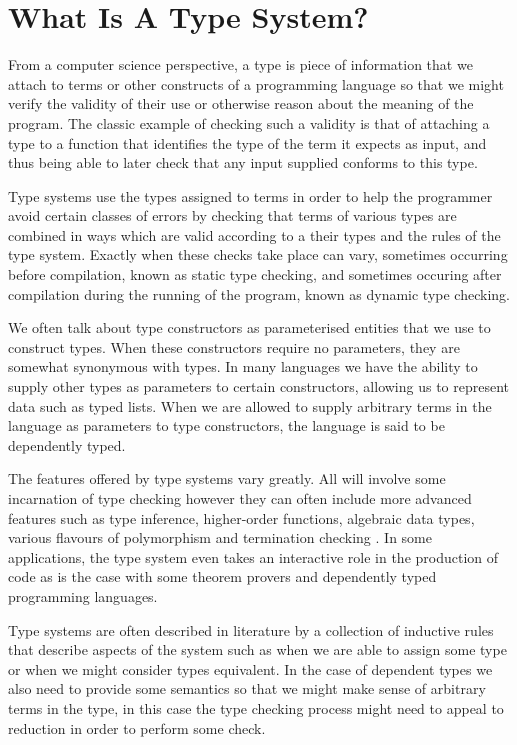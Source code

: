 \chapter{What Is A Type System?}

From a computer science perspective, a type is piece of information
that we attach to terms or other constructs of a programming language
so that we might verify the validity of their use or otherwise reason
about the meaning of the program. The classic example of checking such
a validity is that of attaching a type to a function that identifies
the type of the term it expects as input, and thus being able to later
check that any input supplied conforms to this type.

Type systems use the types assigned to terms in order to help the
programmer avoid certain classes of errors by checking that terms of
various types are combined in ways which are valid according to a
their types and the rules of the type system. Exactly when these
checks take place can vary, sometimes occurring before compilation,
known as static type checking, and sometimes occuring after
compilation during the running of the program, known as dynamic type
checking.

We often talk about type constructors as parameterised entities that
we use to construct types. When these constructors require no
parameters, they are somewhat synonymous with types. In many languages
we have the ability to supply other types as parameters to certain
constructors, allowing us to represent data such as typed lists. When
we are allowed to supply arbitrary terms in the language as
parameters to type constructors, the language is said to be
dependently typed.

The features offered by type systems vary greatly. All will involve
some incarnation of type checking however they can often include
more advanced features such as type inference, higher-order functions,
algebraic data types, various flavours of polymorphism and termination
checking \cite{Abel_2004}. In some applications, the type system even
takes an interactive role in the production of code as is the case
with some theorem provers and dependently typed programming languages. 

Type systems are often described in literature by a collection of
inductive rules that describe aspects of the system such as when we
are able to assign some type or when we might consider types
equivalent. In the case of dependent types we also need to provide
some semantics so that we might make sense of arbitrary terms in the
type, in this case the type checking process might need to appeal to
reduction in order to perform some check.
